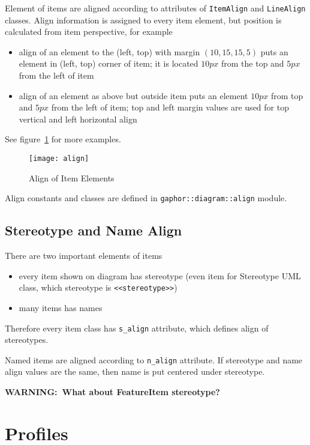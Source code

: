\documentclass[draft]{article}
\newcommand{\rmodule}[1]{\texttt{#1}}
\newcommand{\rclass}[1]{\texttt{#1}}
\newcommand{\rattr}[1]{\texttt{#1}}
\newcommand{\rstereotype}[1]{\texttt{<<#1>>}}
\newcommand{\warning}[1]{\textbf{WARNING:~#1}}
\begin{document}
Element of items are aligned according to attributes of
\rclass{ItemAlign} and \rclass{LineAlign} classes. Align information is
assigned to every item element, but position is calculated from item
perspective, for example
\begin{itemize}
\item align of an element to the (left, top) with margin $(10, 15, 15, 5)$
puts an element in (left, top) corner of item; it is located $10px$ from the top
and $5px$ from the left of item
\item align of an element as above but outside item puts an element $10px$
from top and $5px$ from the left of item; top and left margin values are
used for top vertical and left horizontal align
\end{itemize}
See figure~\ref{items:align} for more examples.

\begin{figure}
\begin{center}
\texttt{[image: align]}
\end{center}
\caption{Align of Item Elements}\label{items:align}
\end{figure}

Align constants and classes are defined in \rmodule{gaphor::diagram::align} module.

\subsection{Stereotype and Name Align}

There are two important elements of items
\begin{itemize}
\item every item shown on diagram has stereotype (even item for Stereotype
    UML class, which stereotype is \rstereotype{stereotype})
\item many items has names
\end{itemize}

Therefore every item class has \rattr{s\_align} attribute, which defines
align of stereotypes.

Named items are aligned according to \rattr{n\_align} attribute. If
stereotype and name align values are the same, then name is put
centered under stereotype.

\warning{What about FeatureItem stereotype?}

\section{Profiles}
\end{document}
